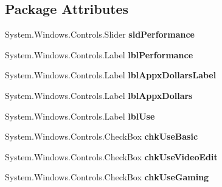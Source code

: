 \subsection*{Package Attributes}
\begin{DoxyCompactItemize}
\item 
System.\+Windows.\+Controls.\+Slider {\bfseries sld\+Performance}\hypertarget{class_p_c_builder_forms_1_1_questionnaire_ac3267ec4c1147b071b1999f5fdd2c9e0}{}\label{class_p_c_builder_forms_1_1_questionnaire_ac3267ec4c1147b071b1999f5fdd2c9e0}

\item 
System.\+Windows.\+Controls.\+Label {\bfseries lbl\+Performance}\hypertarget{class_p_c_builder_forms_1_1_questionnaire_a55404df979e7f8d081d9eb01e0f1f9d2}{}\label{class_p_c_builder_forms_1_1_questionnaire_a55404df979e7f8d081d9eb01e0f1f9d2}

\item 
System.\+Windows.\+Controls.\+Label {\bfseries lbl\+Appx\+Dollars\+Label}\hypertarget{class_p_c_builder_forms_1_1_questionnaire_af6e8662a5f98ec6b0ea9a83c32194c14}{}\label{class_p_c_builder_forms_1_1_questionnaire_af6e8662a5f98ec6b0ea9a83c32194c14}

\item 
System.\+Windows.\+Controls.\+Label {\bfseries lbl\+Appx\+Dollars}\hypertarget{class_p_c_builder_forms_1_1_questionnaire_ab110107164e6fa6bb5066a9019ef3472}{}\label{class_p_c_builder_forms_1_1_questionnaire_ab110107164e6fa6bb5066a9019ef3472}

\item 
System.\+Windows.\+Controls.\+Label {\bfseries lbl\+Use}\hypertarget{class_p_c_builder_forms_1_1_questionnaire_a1fca841040d260bb0c2e38609d80164d}{}\label{class_p_c_builder_forms_1_1_questionnaire_a1fca841040d260bb0c2e38609d80164d}

\item 
System.\+Windows.\+Controls.\+Check\+Box {\bfseries chk\+Use\+Basic}\hypertarget{class_p_c_builder_forms_1_1_questionnaire_abfc851eadf07f61c9baf4b084dba1c6e}{}\label{class_p_c_builder_forms_1_1_questionnaire_abfc851eadf07f61c9baf4b084dba1c6e}

\item 
System.\+Windows.\+Controls.\+Check\+Box {\bfseries chk\+Use\+Video\+Edit}\hypertarget{class_p_c_builder_forms_1_1_questionnaire_a22d8067caf3fddbc5e2ad0c122b65b66}{}\label{class_p_c_builder_forms_1_1_questionnaire_a22d8067caf3fddbc5e2ad0c122b65b66}

\item 
System.\+Windows.\+Controls.\+Check\+Box {\bfseries chk\+Use\+Gaming}\hypertarget{class_p_c_builder_forms_1_1_questionnaire_a01e1cbcd2cade5a159bf07c8a38a1ba1}{}\label{class_p_c_builder_forms_1_1_questionnaire_a01e1cbcd2cade5a159bf07c8a38a1ba1}


\end{DoxyCompactItemize}

